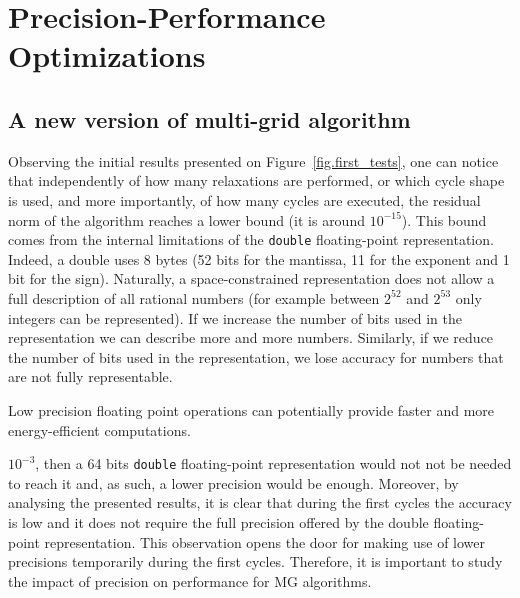 \section{Precision-Performance Optimizations}
\label{sec:precision}

\subsection{A new version of multi-grid algorithm}

Observing the initial results presented on Figure~\ref{fig.first_tests},
one can notice that independently of how many relaxations are performed, or
which cycle shape is used, and more importantly, of how many cycles are
executed, the residual norm of the algorithm reaches a lower bound (it is
around $10^{-15}$). This bound comes from the internal limitations of the
\texttt{double} floating-point representation.  Indeed, a double uses 8 bytes
(52 bits for the mantissa, 11 for the exponent and 1 bit for the sign).
Naturally, a space-constrained representation does not allow a full description
of all rational numbers (for example between $2^{52}$ and $2^{53}$ only
integers can be represented).  If we increase the number of bits used in the
representation we can describe more and more numbers. Similarly, if we reduce
the number of bits used in the representation, we lose accuracy for numbers
that are not fully representable.

Low precision floating point operations can potentially provide faster and more energy-efficient computations.

 $10^{-3}$, then a 64 bits \texttt{double} floating-point
representation would not not be needed to reach it and, as such, a lower precision would be enough.
Moreover, by analysing the presented results, it is clear that during the first
cycles the accuracy is low and it does not require the full precision offered by
the double floating-point representation. This observation opens the door for
making use of lower precisions temporarily during the first cycles. Therefore, it
is important to study the impact of precision on performance for MG algorithms.

